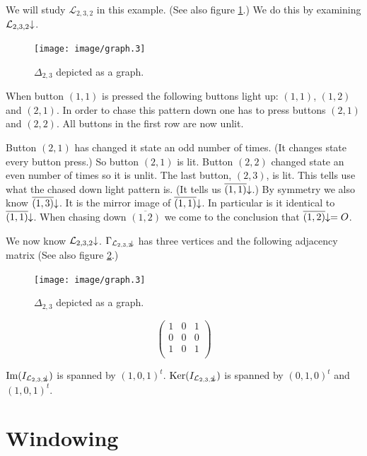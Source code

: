 \begin{example}
	We will study $\mathcal{L}_{2,3,2}$ in this example. (See also figure
	\ref{figure:graph_2,3}.) We do this by examining
	$\mathcal{L}_{2,3,2}\negthickspace\downarrow$.
	\begin{figure}
		\begin{center}
			\texttt{[image: image/graph.3]}
		\end{center}
		\caption{$\Delta_{2,3}$ depicted as a graph.}\label{figure:graph_2,3}
	\end{figure}
	
	When button $(1,1)$ is pressed the following buttons light up: $(1,1)$,
	$(1,2)$ and $(2,1)$. In order to chase this pattern down one has to
	press buttons $(2,1)$ and $(2,2)$. All buttons in the first row are now
	unlit. 
	
	Button $(2,1)$ has changed it state an odd number of times. (It	changes
	state every button press.) So button $(2,1)$ is lit. Button $(2,2)$
	changed state an even number of times so it is unlit. The last button,
	$(2,3)$, is lit. This tells use what the chased down light pattern is.
	(It tells us $\overline{(1,1)}\negthickspace\downarrow$.) By symmetry we also know
	$\overline{(1,3)}\negthickspace\downarrow$. It is the mirror image of
	$\overline{(1,1)}\negthickspace\downarrow$. In particular is it identical to
	$\overline{(1,1)}\negthickspace\downarrow$. When chasing down $\overline{(1,2)}$ we come to
	the conclusion that $\overline{(1,2)}\negthickspace\downarrow=O$.
	
	We now know $\mathcal{L}_{2,3,2}\negthickspace\downarrow$.
	$\Gamma_{\mathcal{L}_{2,3,2}\negthickspace\downarrow}$ has three vertices and the following
	adjacency matrix (See also figure \ref{figure:graph_2,3down}.)
	\begin{figure}
		\begin{center}
			\texttt{[image: image/graph.3]}
		\end{center}
		\caption{$\Delta_{2,3}$ depicted as a graph.}\label{figure:graph_2,3down}
	\end{figure}
	\[
		\left(
		\begin{array}{ccc}
			1 & 0 & 1 \\
			0 & 0 & 0 \\
			1 & 0 & 1 \\
		\end{array}
		\right)
	\]
	
	$\operatorname{Im}(I_{\mathcal{L}_{2,3,2}\negthickspace\downarrow})$ is spanned by $(1,0,1)^{t}$.
	$\operatorname{Ker}(I_{\mathcal{L}_{2,3,2}\negthickspace\downarrow})$ is spanned by $(0,1,0)^{t}$ and
	$(1,0,1)^{t}$.
\end{example}

\section{Windowing}

